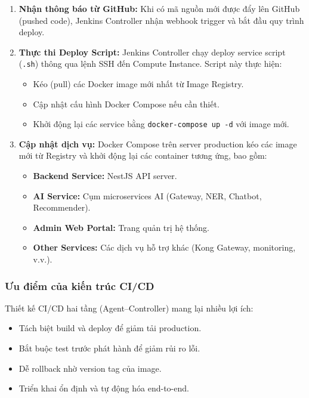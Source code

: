 \begin{enumerate}
    \item \textbf{Nhận thông báo từ GitHub:} Khi có mã nguồn mới được đẩy lên GitHub (pushed code), Jenkins Controller nhận webhook trigger và bắt đầu quy trình deploy.
    
    \item \textbf{Thực thi Deploy Script:} Jenkins Controller chạy deploy service script (\texttt{.sh}) thông qua lệnh SSH đến Compute Instance. Script này thực hiện:
    \begin{itemize}
        \item Kéo (pull) các Docker image mới nhất từ Image Registry.
        \item Cập nhật cấu hình Docker Compose nếu cần thiết.
        \item Khởi động lại các service bằng \texttt{docker-compose up -d} với image mới.
    \end{itemize}
    
    \item \textbf{Cập nhật dịch vụ:} Docker Compose trên server production kéo các image mới từ Registry và khởi động lại các container tương ứng, bao gồm:
    \begin{itemize}
        \item \textbf{Backend Service:} NestJS API server.
        \item \textbf{AI Service:} Cụm microservices AI (Gateway, NER, Chatbot, Recommender).
        \item \textbf{Admin Web Portal:} Trang quản trị hệ thống.
        \item \textbf{Other Services:} Các dịch vụ hỗ trợ khác (Kong Gateway, monitoring, v.v.).
    \end{itemize}
\end{enumerate}

\subsubsection{Ưu điểm của kiến trúc CI/CD}

Thiết kế CI/CD hai tầng (Agent--Controller) mang lại nhiều lợi ích:

\begin{itemize}
    \item Tách biệt build và deploy để giảm tải production.
    \item Bắt buộc test trước phát hành để giảm rủi ro lỗi.
    \item Dễ rollback nhờ version tag của image.
    \item Triển khai ổn định và tự động hóa end-to-end.
\end{itemize}

